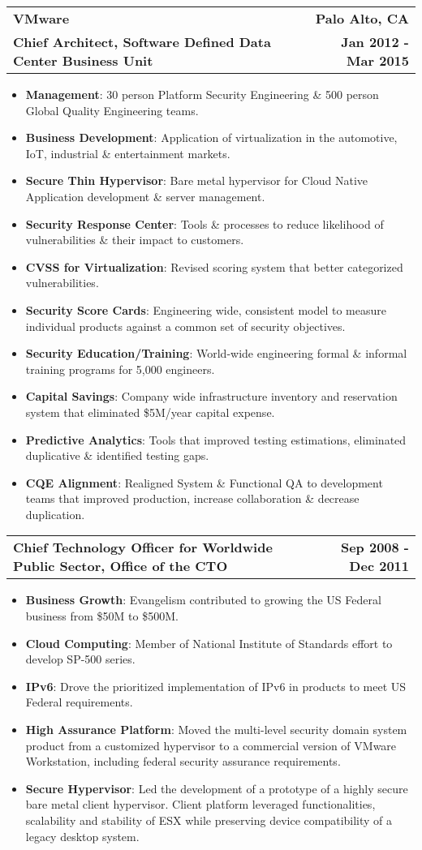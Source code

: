 \documentclass[letterpaper,10pt, sans]{article}
\makeatletter
\newcommand{\resumeCompanyHeading}[4]{
  \vspace{-1pt}
    \item
    \begin{tabular*}{1.0\textwidth}[t]{l@{\extracolsep{\fill}}r}
      \textbf{#1} & \textbf{#2} \\
      \textbf{#3} & \textbf{#4}
    \end{tabular*}\vspace{-1pt}
  }
\newcommand{\resumeCompanyPositionHeading}[2]{
    \vspace{-1pt}
      \item
      \begin{tabular*}{1.0\textwidth}{l@{\extracolsep{\fill}}r}
        \textbf{#1} & \textbf{#2}
    \end{tabular*}\vspace{-1pt}
}
\newcommand{\resumeItem}[2]{\item{{\textbf{#1}}: {#2 \vspace{1pt}}}}
\newcommand{\resumeItemListStart}{\begin{itemize}}\vspace{-1pt}
\newcommand{\resumeItemListEnd}{\end{itemize}}\vspace{-1pt}
\makeatother
\begin{document}
        \resumeCompanyHeading
            {VMware}
            {Palo Alto, CA}
            {Chief Architect, Software Defined Data Center Business Unit}
            {Jan 2012 - Mar 2015}
            \resumeItemListStart
                \resumeItem{Management}{30 person Platform Security Engineering \& 500 person Global Quality Engineering teams.}
                \resumeItem{Business Development}{Application of virtualization in the automotive, IoT, industrial \& entertainment markets.}
                \resumeItem{Secure Thin Hypervisor}{Bare metal hypervisor for Cloud Native Application development \& server management.}
                \resumeItem{Security Response Center}{Tools \& processes to reduce likelihood of vulnerabilities \& their impact to customers.}
                \resumeItem{CVSS for Virtualization}{Revised scoring system that better categorized vulnerabilities.}
                \resumeItem{Security Score Cards}{Engineering wide, consistent model to measure individual products against a common set of security objectives.}
                \resumeItem{Security Education/Training}{World-wide engineering formal \& informal training programs for 5,000 engineers.}
                \resumeItem{Capital Savings}{Company wide infrastructure inventory and reservation system that eliminated \$5M/year capital expense.}
                \resumeItem{Predictive Analytics}{Tools that improved testing estimations, eliminated duplicative \& identified testing gaps.}
                \resumeItem{CQE Alignment}{Realigned System \& Functional QA to development teams that improved production, increase collaboration \& decrease duplication.}
            \resumeItemListEnd
  
          \resumeCompanyPositionHeading
            {Chief Technology Officer for Worldwide Public Sector, Office of the CTO}
            {Sep 2008 - Dec 2011}
            \resumeItemListStart
                \resumeItem{Business Growth}{Evangelism contributed to growing the US Federal business from \$50M to \$500M.}
                \resumeItem{Cloud Computing}{Member of National Institute of Standards effort to develop SP-500 series.}
                \resumeItem{IPv6}{Drove the prioritized implementation of IPv6 in products to meet US Federal requirements.}
                \resumeItem{High Assurance Platform}{Moved the multi-level security domain system product from a customized hypervisor to a 
                  commercial version of VMware Workstation, including federal security assurance requirements.}
                \resumeItem{Secure Hypervisor}{Led the development of a prototype of a highly secure bare metal client hypervisor. Client platform leveraged
                  functionalities, scalability and stability of ESX while preserving device compatibility of a legacy desktop system.}
            \resumeItemListEnd
  
\end{document}
